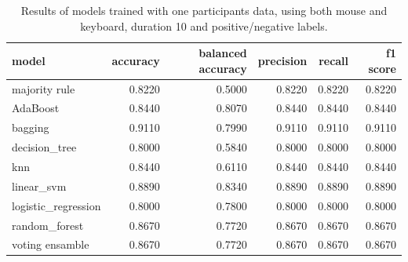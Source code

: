 \documentclass[../main.tex]{subfiles}
\begin{document}
\begin{table}[!h]
    \centering
    \begin{tabular}{lrrrrr}
        \toprule
                       model &  accuracy &  balanced accuracy &  precision &  recall &  f1 score \\
        \midrule
               majority rule &    0.8220 &             0.5000 &     0.8220 &  0.8220 &    0.8220 \\
                    AdaBoost &    0.8440 &             0.8070 &     0.8440 &  0.8440 &    0.8440 \\
                     bagging &    0.9110 &             0.7990 &     0.9110 &  0.9110 &    0.9110 \\
               decision\_tree &    0.8000 &             0.5840 &     0.8000 &  0.8000 &    0.8000 \\
                         knn &    0.8440 &             0.6110 &     0.8440 &  0.8440 &    0.8440 \\
                  linear\_svm &    0.8890 &             0.8340 &     0.8890 &  0.8890 &    0.8890 \\
         logistic\_regression &    0.8000 &             0.7800 &     0.8000 &  0.8000 &    0.8000 \\
               random\_forest &    0.8670 &             0.7720 &     0.8670 &  0.8670 &    0.8670 \\
             voting ensamble &    0.8670 &             0.7720 &     0.8670 &  0.8670 &    0.8670 \\
        \bottomrule
    \end{tabular}
    \caption{Results of models trained with one participants data, using both mouse and keyboard, duration 10 and positive/negative labels.}                     
\end{table}
\end{document}
